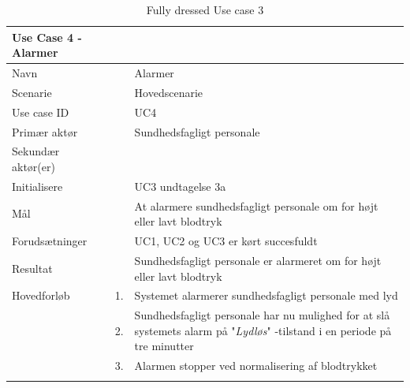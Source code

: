 
\begin{longtabu} to 
\toprule
    {\large \textbf{Use Case 4 - Alarmer}} && \\
    \toprule
    Navn &&    Alarmer\\
    Scenarie &&    Hovedscenarie\\
    Use case ID &&    UC4\\
    Primær aktør &&    Sundhedsfagligt personale\\
    Sekundær aktør(er) &&    \\
    Initialisere &&    UC3 undtagelse 3a\\
    Mål &&    At alarmere sundhedsfagligt personale om for højt eller lavt blodtryk\\
    Forudsætninger &&    UC1, UC2 og UC3 er kørt succesfuldt\\
    Resultat &&    Sundhedsfagligt personale er alarmeret om for højt eller lavt blodtryk\\
    \toprule
    Hovedforløb &    1. &    Systemet alarmerer sundhedsfagligt personale med lyd\\[-1ex]
                &	2.	&	Sundhedsfagligt personale har nu mulighed for at slå systemets alarm på "\textit{Lydløs}"\- -tilstand i en periode på tre minutter\\[-1ex]
                    &	3.	&	Alarmen stopper ved normalisering af blodtrykket\\[-1ex]

                \toprule
\caption{Fully dressed Use case 3}
\label{UC3}
\end{longtabu}
\newpage



